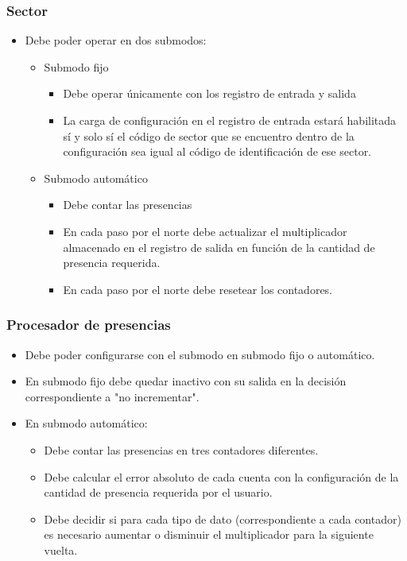 \subsubsection{Sector}
\begin{itemize}
\item Debe poder operar en dos submodos:
	\begin{itemize}
	\item Submodo fijo
	
	
		\begin{itemize}
		\item Debe operar únicamente con los registro de entrada y salida
		\item La carga de configuración en el registro de entrada estará habilitada sí y solo sí el código de sector que se encuentro dentro de la configuración sea igual al código de identificación de ese sector.
		\end{itemize}
	
	
	
	\item Submodo automático
		\begin{itemize}
		\item Debe contar las presencias
		\item En cada paso por el norte debe actualizar el multiplicador almacenado en el registro de salida en función de la cantidad de presencia requerida.
		\item En cada paso por el norte debe resetear los contadores.
		\end{itemize}
	
	
	\end{itemize}
\end{itemize}



\subsubsection{Procesador de presencias}
\begin{itemize}

\item Debe poder configurarse con el submodo en submodo fijo o automático.
\item En submodo fijo debe quedar inactivo con su salida en la decisión correspondiente a "no incrementar".
\item En submodo automático:
	\begin{itemize}
	\item Debe contar las presencias en tres contadores diferentes.
	\item Debe calcular el error absoluto de cada cuenta con la configuración de la cantidad de presencia requerida por el usuario.
	\item Debe decidir si para cada tipo de dato (correspondiente a cada contador) es necesario aumentar o disminuir el multiplicador para la siguiente vuelta.
	\end{itemize}

\end{itemize}

